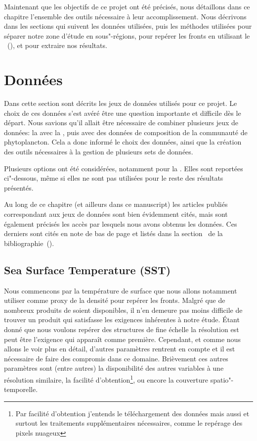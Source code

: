 
\label{chp:methodes}
\graphicspath{{resources/méthodes}}

\minitoc%
\clearpage

Maintenant que les objectifs de ce projet ont été précisés, nous détaillons dans ce chapitre l'ensemble des outils nécessaire à leur accomplissement.
Nous décrivons dans les sections qui suivent les données utilisées, puis les méthodes utilisées pour séparer notre zone d'étude en sous"-régions, pour repérer les fronts en utilisant le ~(), et pour extraire nos résultats.

\section{Données}
\label{sec:donnees}

Dans cette section sont décrits les jeux de données utilisés pour ce projet.
Le choix de ces données s'est avéré être une question importante et difficile dès le départ.
Nous savions qu'il allait être nécessaire de combiner plusieurs jeux de données: la  avec la , puis avec des données de composition de la communauté de phytoplancton.
Cela a donc informé le choix des données, ainsi que la création des outils nécessaires à la gestion de plusieurs sets de données.

Plusieurs options ont été considérées, notamment pour la .
Elles sont reportées ci"-dessous, même si elles ne sont pas utilisées pour le reste des résultats présentés.

Au long de ce chapitre (et ailleurs dans ce manuscript) les articles publiés correspondant aux jeux de données sont bien évidemment cités, mais sont également précisés les accès par lesquels nous avons obtenus les données.
Ces derniers sont cités en note de bas de page et listés dans la section~ de la bibliographie~().

\subsection{Sea Surface Temperature (SST)}
\label{sec:donnees-sst}

Nous commencons par la température de surface que nous allons notamment utiliser comme proxy de la densité pour repérer les fronts.
Malgré que de nombreux produits de  soient disponibles, il n'en demeure pas moins difficile de trouver un produit qui satisfasse les exigences inhérentes à notre étude.
Étant donné que nous voulons repérer des structures de fine échelle la résolution est peut être l’exigence qui apparaît comme première.
Cependant, et comme nous allons le voir plus en détail, d'autres paramètres rentrent en compte et il est nécessaire de faire des compromis dans ce domaine.
Brièvement ces autres paramètres sont (entre autres) la disponibilité des autres variables à une résolution similaire, la facilité d'obtention\footnote{%
  Par facilité d'obtention j'entends le téléchargement des données mais aussi et surtout les traitements supplémentaires nécessaires, comme le repérage des pixels nuageux },
ou encore la couverture spatio"-temporelle.

